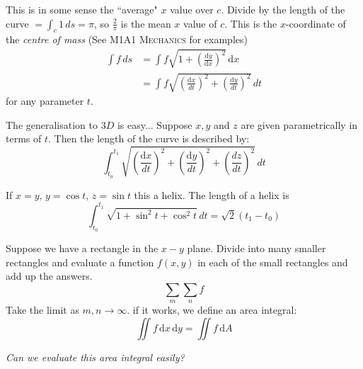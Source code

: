 \documentclass[10pt]{scrartcl}
\begin{document}
This is in some sense the ``average" $x$ value over $c$. Divide by the length of the curve $= \int_c 1\,ds = \pi$, so $\frac{2}{\pi}$ is the mean $x$ value of $c$. This is the $x$-coordinate of the \emph{centre of mass} (See \textsc{M1A1 Mechanics} for examples)
\begin{align*}
  \int f\,ds &= \int f\sqrt{1 + \left(\frac{\mathrm{d}y}{\mathrm{d}x}\right)^2}\,\mathrm{d}x \\
  &= \int f\sqrt{\left(\frac{\mathrm{d}x}{dt}\right)^2 + \left(\frac{\mathrm{d}y}{dt}\right)^2}\,dt
\end{align*}
for any parameter $t$. 

The generalisation to $3D$ is easy... Suppose $x,y$ and $z$ are given parametrically in terms of $t$. Then the length of the curve is described by:
\[
  \int_{t_0}^{t_1}\sqrt{\left(\frac{\mathrm{d}x}{dt}\right)^2 + \left(\frac{\mathrm{d}y}{dt}\right)^2 + \left(\frac{dz}{dt}\right)^2}\,dt
\]

\begin{example} If $x = y,\, y= \cos t,\, z = \sin t$ this a helix. The length of a helix is 
\[
  \int_{t_0}^{t_1} \sqrt{1 + \sin^2t + \cos^2t}\,dt = \sqrt{2}(t_1 - t_0)
\]
\end{example}




Suppose we have a rectangle in the $x-y$ plane. Divide into many smaller rectangles and evaluate a function $f(x,y)$ in each of the small rectangles and add up the answers. 
\[
  \sum_m \sum_n f
\]
Take the limit as $m,n \to \infty$. if it works, we define an area integral:
\[
  \iint f\,\mathrm{d}x\,\mathrm{d}y= \iint f\,\mathrm{d}A
\]

\emph{Can we evaluate this area integral easily? }\\
\end{document}
